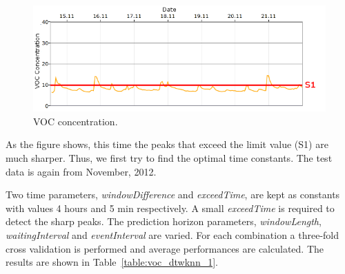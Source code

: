\begin{center}
\begin{figure}[h!]
\includegraphics[scale=0.7]{images/voc_1.png}
\caption{VOC concentration.}
\label{fig:voc_1}
\end{figure}
\end{center}

As the figure shows, this time the peaks that exceed the limit value (S1) are much sharper. Thus, we first try to find the optimal time constants. The test data is again from November, 2012.

Two time parameters, \emph{windowDifference} and \emph{exceedTime}, are kept as constants with values 4 hours and 5 min respectively. A small \emph{exceedTime} is required to detect the sharp peaks. The prediction horizon parameters, \emph{windowLength}, \emph{waitingInterval} and \emph{eventInterval} are varied. For each combination a three-fold cross validation is performed and average performances are calculated. The results are shown in Table~\ref{table:voc_dtwknn_1}.

